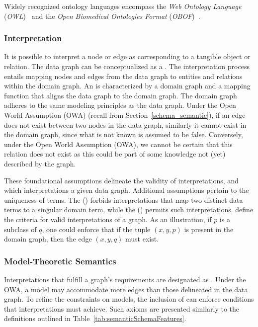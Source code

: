 Widely recognized ontology languages encompass the \textit{Web Ontology Language} (\textit{OWL})~\cite{Hitzler2014OWLPrimer} and the \textit{Open Biomedical Ontologies Format} (\textit{OBOF})~\cite{Mungall2012OBOF}.

\subsubsection{Interpretation}
It is possible to interpret a node or edge as corresponding to a tangible object or relation. The data graph can be conceptualized as a . The interpretation process entails mapping nodes and edges from the data graph to entities and relations within the domain graph. An  is characterized by a domain graph and a mapping function that aligns the data graph to the domain graph. The domain graph adheres to the same modeling principles as the data graph. Under the Open World Assumption (OWA) (recall from Section~\ref{schema_semantic}), if an edge does not exist between two nodes in the data graph, similarly it cannot exist in the domain graph, since what is not known is assumed to be false. Conversely, under the Open World Assumption (OWA), we cannot be certain that this relation does not exist as this could be part of some knowledge not (yet) described by the graph. 

These foundational assumptions delineate the validity of interpretations, and which interpretations  a given data graph. Additional assumptions pertain to the uniqueness of terms. The  () forbids interpretations that map two distinct data terms to a singular domain term, while the  () permits such interpretations.
 define the criteria for valid interpretations of a graph. As an illustration, if $p$ is a subclass of $q$, one could enforce that if the tuple $(x,y,p)$ is present in the domain graph, then the edge $(x,y,q)$ must exist.

\subsubsection{Model-Theoretic Semantics}
Interpretations that fulfill a graph's requirements are designated as . Under the OWA, a model may accommodate more edges than those delineated in the data graph. To refine the constraints on models, the inclusion of  can enforce conditions that interpretations must achieve. Such axioms are presented similarly to the definitions outlined in Table~\ref{tab:semanticSchemaFeatures}.


